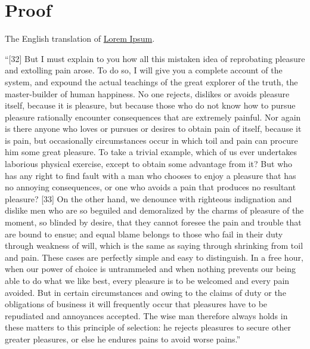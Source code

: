 \documentclass[letterpaper]{amsart}
\begin{document}
\section*{Proof}
The English translation of \href{https://en.wikipedia.org/wiki/Lorem_ipsum#Source_text}{Lorem Ipsum}.
\begin{ddanger}
    ``[32] But I must explain to you how all this mistaken idea of reprobating pleasure and extolling pain arose.
    To do so, I will give you a complete account of the system, and expound the actual teachings of the great explorer of the truth, the master-builder of human happiness.
    No one rejects, dislikes or avoids pleasure itself, because it is pleasure, but because those who do not know how to pursue pleasure rationally encounter consequences that are extremely painful.
    Nor again is there anyone who loves or pursues or desires to obtain pain of itself, because it is pain, but occasionally circumstances occur in which toil and pain can procure him some great pleasure.
    To take a trivial example, which of us ever undertakes laborious physical exercise, except to obtain some advantage from it?
    But who has any right to find fault with a man who chooses to enjoy a pleasure that has no annoying consequences, or one who avoids a pain that produces no resultant pleasure?
    [33] On the other hand, we denounce with righteous indignation and dislike men who are so beguiled and demoralized by the charms of pleasure of the moment, so blinded by desire, that they cannot foresee the pain and trouble that are bound to ensue; and equal blame belongs to those who fail in their duty through weakness of will, which is the same as saying through shrinking from toil and pain.
    These cases are perfectly simple and easy to distinguish.
    In a free hour, when our power of choice is untrammeled and when nothing prevents our being able to do what we like best, every pleasure is to be welcomed and every pain avoided.
    But in certain circumstances and owing to the claims of duty or the obligations of business it will frequently occur that pleasures have to be repudiated and annoyances accepted.
    The wise man therefore always holds in these matters to this principle of selection: he rejects pleasures to secure other greater pleasures, or else he endures pains to avoid worse pains.''~\cite{book:lorem_ipsum}\hfill{}
\end{ddanger}

\printbibliography
\end{document}
